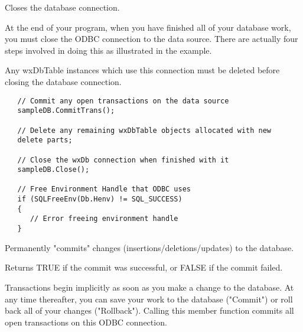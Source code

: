 \label{wxdbclose}


Closes the database connection.


At the end of your program, when you have finished all of your database work, you must close the ODBC connection to the data source.  There are actually four steps involved in doing this as illustrated in the example.  

Any wxDbTable instances which use this connection must be deleted before closing the database connection.


\begin{verbatim}
   // Commit any open transactions on the data source
   sampleDB.CommitTrans();

   // Delete any remaining wxDbTable objects allocated with new
   delete parts;

   // Close the wxDb connection when finished with it
   sampleDB.Close();

   // Free Environment Handle that ODBC uses
   if (SQLFreeEnv(Db.Henv) != SQL_SUCCESS)
   {
      // Error freeing environment handle
   }
\end{verbatim}


\label{wxdbcommittrans}


Permanently "commits" changes (insertions/deletions/updates) to the database.  


Returns TRUE if the commit was successful, or FALSE if the commit failed.


Transactions begin implicitly as soon as you make a change to the database.  At any time thereafter, you can save your work to the database ("Commit") or roll back all of your changes  ("Rollback").  Calling this member function commits all open transactions on this ODBC connection.


